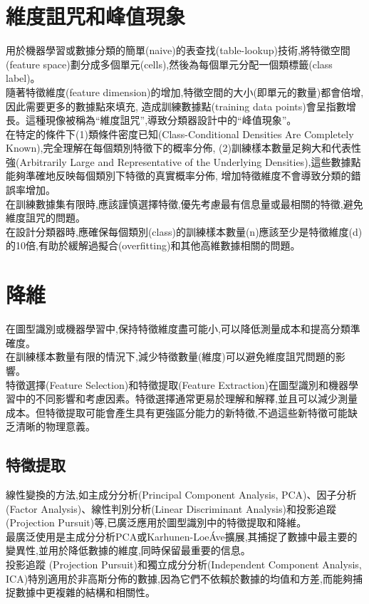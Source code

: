 \documentclass[10pt, a4paper]{article}
\begin{document}
\begin{CJK*}{UTF8}{bsmi}
\section{維度詛咒和峰值現象}
用於機器學習或數據分類的簡單(naive)的表查找(table-lookup)技術,將特徵空間(feature space)劃分成多個單元(cells),然後為每個單元分配一個類標籤(class label)。\\[0.5em]
隨著特徵維度(feature dimension)的增加,特徵空間的大小(即單元的數量)都會倍增,因此需要更多的數據點來填充, 造成訓練數據點(training data points)會呈指數增長。這種現像被稱為“維度詛咒”,導致分類器設計中的“峰值現象”。 \\[0.5em] 
在特定的條件下(1)類條件密度已知(Class-Conditional Densities Are Completely Known),完全理解在每個類別特徵下的概率分佈, (2)訓練樣本數量足夠大和代表性強(Arbitrarily Large and Representative of the Underlying Densities),這些數據點能夠準確地反映每個類別下特徵的真實概率分佈, 增加特徵維度不會導致分類的錯誤率增加。\\[0.5em]
在訓練數據集有限時,應該謹慎選擇特徵,優先考慮最有信息量或最相關的特徵,避免維度詛咒的問題。 \\[0.5em]
在設計分類器時,應確保每個類別(class)的訓練樣本數量(n)應該至少是特徵維度(d)的10倍,有助於緩解過擬合(overfitting)和其他高維數據相關的問題。

\section{降維}
在圖型識別或機器學習中,保持特徵維度盡可能小,可以降低測量成本和提高分類準確度。\\[0.5em]
在訓練樣本數量有限的情況下,減少特徵數量(維度)可以避免維度詛咒問題的影響。\\[0.5em]
特徵選擇(Feature Selection)和特徵提取(Feature Extraction)在圖型識別和機器學習中的不同影響和考慮因素。特徵選擇通常更易於理解和解釋,並且可以減少測量成本。但特徵提取可能會產生具有更強區分能力的新特徵,不過這些新特徵可能缺乏清晰的物理意義。
\subsection{特徵提取}
線性變換的方法,如主成分分析(Principal Component Analysis, PCA)、因子分析(Factor Analysis)、線性判別分析(Linear Discriminant Analysis)和投影追蹤(Projection Pursuit)等,已廣泛應用於圖型識別中的特徵提取和降維。 \\[0.5em]
最廣泛使用是主成分分析PCA或Karhunen-LoeÁve擴展,其捕捉了數據中最主要的變異性,並用於降低數據的維度,同時保留最重要的信息。\\[0.5em]
投影追蹤 (Projection Pursuit)和獨立成分分析(Independent Component Analysis, ICA)特別適用於非高斯分佈的數據,因為它們不依賴於數據的均值和方差,而能夠捕捉數據中更複雜的結構和相關性。

\end{CJK*}
\end{document}
